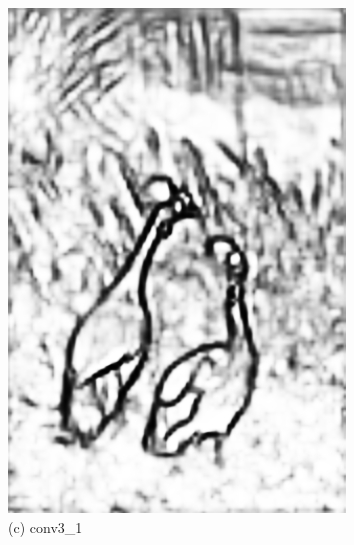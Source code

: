 \documentclass[CJK,aspectratio=169]{beamer}  %
\begin{document}
\begin{frame}
\begin{figure}
\begin{minipage}{0.11\columnwidth}
				\includegraphics[width=\linewidth]{picture/LLIE/RCF/conv3_1}
				\caption*{\tiny (c) conv3\_1}
				\label{fig: conv3_1}	
			\end{minipage}
			\begin{minipage}{0.11\columnwidth}

\end{minipage}
\end{figure}
\end{frame}
\end{document}
